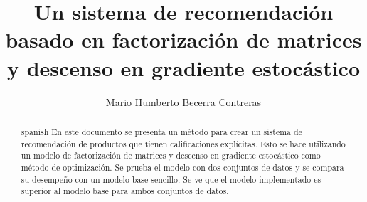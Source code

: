 \documentclass{tesisITAM}
\title{Un sistema de recomendación basado en factorización de matrices y descenso en gradiente estocástico}
\author{Mario Humberto Becerra Contreras}
\begin{document}
	\npthousandsep{,}
	\maketitle
	\publicationrights


	\begin{abstract}{spanish}
		En este documento se presenta un método para crear un sistema de recomendación de productos que tienen calificaciones explícitas. Esto se hace utilizando un modelo de factorización de matrices y descenso en gradiente estocástico como método de optimización. Se prueba el modelo con dos conjuntos de datos y se compara su desempeño con un modelo base sencillo. Se ve que el modelo implementado es superior al modelo base para ambos conjuntos de datos.
	\end{abstract}

	\setcounter{page}{1}

	\tableofcontents
	\listoffigures
	\listoftables
	\newpage

	\setcounter{page}{1}


	
	
	
	
	

	

	
	

	\appendix

	\clearpage
	


\printbibliography
\nocite{*}
\end{document}
